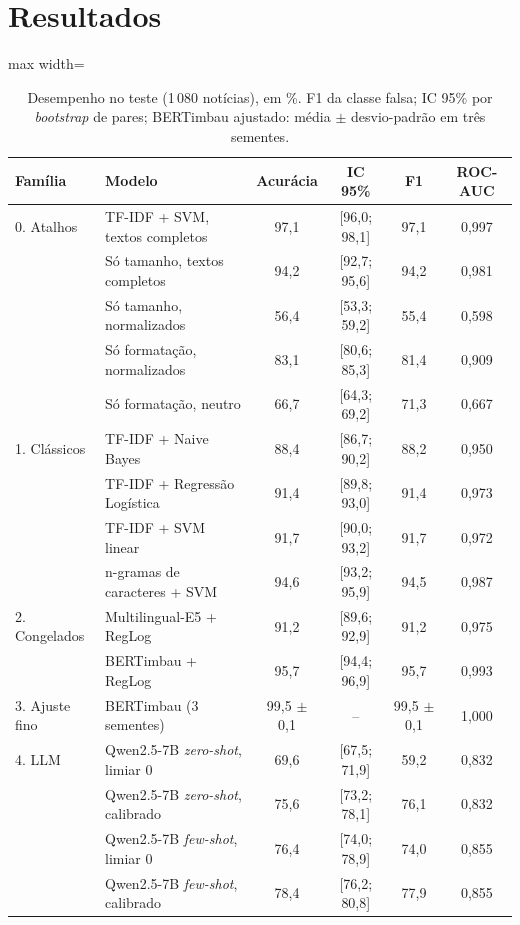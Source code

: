 \section{Resultados}

\begin{table}[t]
\centering\small
\begin{adjustbox}{max width=\textwidth}
\begin{tabular}{llcccc}
\toprule
Família & Modelo & Acurácia & IC 95\% & F1 & ROC-AUC \\
\midrule
0. Atalhos & TF-IDF + SVM, textos completos & 97,1 & [96,0; 98,1] & 97,1 & 0,997 \\
 & Só tamanho, textos completos & 94,2 & [92,7; 95,6] & 94,2 & 0,981 \\
 & Só tamanho, normalizados & 56,4 & [53,3; 59,2] & 55,4 & 0,598 \\
 & Só formatação, normalizados & 83,1 & [80,6; 85,3] & 81,4 & 0,909 \\
 & Só formatação, neutro & 66,7 & [64,3; 69,2] & 71,3 & 0,667 \\
\midrule
1. Clássicos & TF-IDF + Naive Bayes & 88,4 & [86,7; 90,2] & 88,2 & 0,950 \\
 & TF-IDF + Regressão Logística & 91,4 & [89,8; 93,0] & 91,4 & 0,973 \\
 & TF-IDF + SVM linear & 91,7 & [90,0; 93,2] & 91,7 & 0,972 \\
 & n-gramas de caracteres + SVM & 94,6 & [93,2; 95,9] & 94,5 & 0,987 \\
\midrule
2. Congelados & Multilingual-E5 + RegLog & 91,2 & [89,6; 92,9] & 91,2 & 0,975 \\
 & BERTimbau + RegLog & 95,7 & [94,4; 96,9] & 95,7 & 0,993 \\
\midrule
3. Ajuste fino & BERTimbau (3 sementes) & 99,5 $\pm$ 0,1 & -- & 99,5 $\pm$ 0,1 & 1,000 \\
\midrule
4. LLM & Qwen2.5-7B \emph{zero-shot}, limiar 0 & 69,6 & [67,5; 71,9] & 59,2 & 0,832 \\
 & Qwen2.5-7B \emph{zero-shot}, calibrado & 75,6 & [73,2; 78,1] & 76,1 & 0,832 \\
 & Qwen2.5-7B \emph{few-shot}, limiar 0 & 76,4 & [74,0; 78,9] & 74,0 & 0,855 \\
 & Qwen2.5-7B \emph{few-shot}, calibrado & 78,4 & [76,2; 80,8] & 77,9 & 0,855 \\
\bottomrule
\end{tabular}
\end{adjustbox}
\caption{Desempenho no teste (1\,080 notícias), em \%. F1 da classe falsa; IC 95\% por \emph{bootstrap} de pares; BERTimbau ajustado: média $\pm$ desvio-padrão em três sementes.}
\label{tab:resultados}
\end{table}

